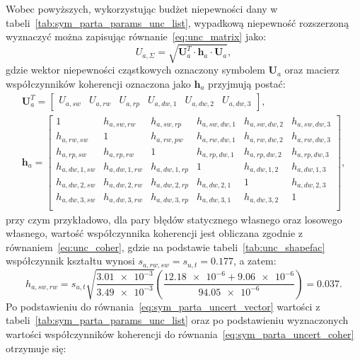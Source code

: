 Wobec powyższych, wykorzystując budżet niepewności dany w tabeli~\ref{tab:sym_parta_params_unc_list}, wypadkową niepewność rozszerzoną wyznaczyć można zapisując równanie~\eqref{eq:unc_matrix} jako:
\begin{equation}
U_{a,\Sigma} = \sqrt{\mathbf{U}_{a}^{T} \cdot \mathbf{h}_{a} \cdot \mathbf{U}_{a}} \label{eq:sym_parta_uncert_sum},
\end{equation}
gdzie wektor niepewności cząstkowych oznaczony symbolem $\mathbf{U}_{a}$ oraz macierz współczynników koherencji oznaczona jako $\mathbf{h}_{a}$ przyjmują postać:
\begin{gather}
\mathbf{U}_{a}^{T} =
\begin{bmatrix}
U_{a,sw} & U_{a,rw} & U_{a,rp} & U_{a,dw,1} & U_{a,dw,2} & U_{a,dw,3}
\end{bmatrix}
\label{eq:sym_parta_uncert_vector}, \\
\mathbf{h}_{a} =
\begin{bmatrix}
1             & h_{a,sw,rw}   & h_{a,sw,rp}   & h_{a,sw,dw,1} & h_{a,sw,dw,2} & h_{a,sw,dw,3} \\
h_{a,rw,sw}   & 1             & h_{a,rw,pw}   & h_{a,rw,dw,1} & h_{a,rw,dw,2} & h_{a,rw,dw,3} \\
h_{a,rp,sw}   & h_{a,rp,rw}   & 1             & h_{a,rp,dw,1} & h_{a,rp,dw,2} & h_{a,rp,dw,3} \\
h_{a,dw,1,sw} & h_{a,dw,1,rw} & h_{a,dw,1,rp} & 1             & h_{a,dw,1,2}  & h_{a,dw,1,3}  \\
h_{a,dw,2,sw} & h_{a,dw,2,rw} & h_{a,dw,2,rp} & h_{a,dw,2,1}  & 1             & h_{a,dw,2,3}  \\
h_{a,dw,3,sw} & h_{a,dw,3,rw} & h_{a,dw,3,rp} & h_{a,dw,3,1}  & h_{a,dw,3,2}  & 1             \\
\end{bmatrix}
\label{eq:sym_parta_uncert_coher},
\end{gather}
przy czym przykładowo, dla pary błędów statycznego własnego oraz losowego własnego, wartość współczynnika koherencji jest obliczana zgodnie z równaniem~\eqref{eq:unc_coher}, gdzie na podstawie tabeli~\ref{tab:unc_shapefac} współczynnik kształtu wynosi $s_{a,rw,sw} = s_{u,t} = \num{0.177}$, a zatem:
\begin{equation}
h_{a,sw,rw} = s_{u,t} \sqrt{\frac{\num{3.01e-3}}{\num{3.49e-3}}} \left( \frac{\num{12.18e-6} + \num{9.06e-6}}{\num{94.05e-6}} \right) = \num{0.037} \label{eq:sym_parta_coher_sw_rw}.
\end{equation}
Po podstawieniu do równania~\eqref{eq:sym_parta_uncert_vector} wartości z tabeli~\ref{tab:sym_parta_params_unc_list} oraz po podstawieniu wyznaczonych wartości współczynników koherencji do równania~\eqref{eq:sym_parta_uncert_coher} otrzymuje się:
